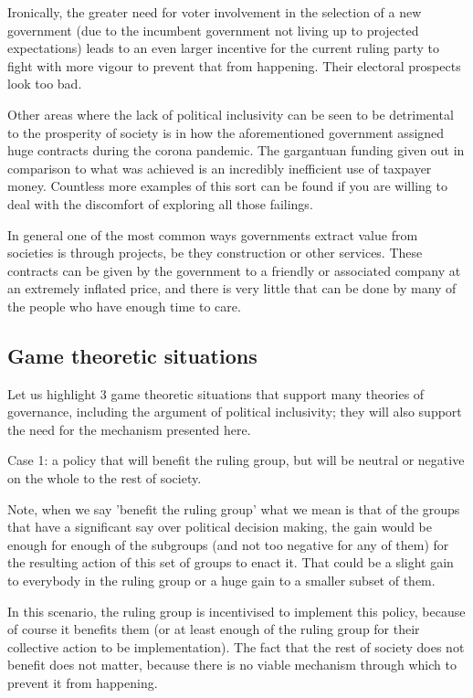 \documentclass[twoside]{article}
\begin{document}
Ironically, the greater need for voter involvement in the selection of a new government (due to the incumbent government not living up to projected expectations) leads to an even larger incentive for the current ruling party to fight with more vigour to prevent that from happening. Their electoral prospects look too bad.

Other areas where the lack of political inclusivity can be seen to be detrimental to the prosperity of society is in how the aforementioned government assigned huge contracts during the corona pandemic. The gargantuan funding given out in comparison to what was achieved is an incredibly inefficient use of taxpayer money. Countless more examples of this sort can be found if you are willing to deal with the discomfort of exploring all those failings.

In general one of the most common ways governments extract value from societies is through projects, be they construction or other services. These contracts can be given by the government to a friendly or associated company at an extremely inflated price, and there is very little that can be done by many of the people who have enough time to care.

\subsection{Game theoretic situations}

Let us highlight 3 game theoretic situations that support many theories of governance, including the argument of political inclusivity; they will also support the need for the mechanism presented here.

Case 1: a policy that will benefit the ruling group, but will be neutral or negative on the whole to the rest of society.

Note, when we say 'benefit the ruling group' what we mean is that of the groups that have a significant say over political decision making, the gain would be enough for enough of the subgroups (and not too negative for any of them) for the resulting action of this set of groups to enact it. That could be a slight gain to everybody in the ruling group or a huge gain to a smaller subset of them.

In this scenario, the ruling group is incentivised to implement this policy, because of course it benefits them (or at least enough of the ruling group for their collective action to be implementation). The fact that the rest of society does not benefit does not matter, because there is no viable mechanism through which to prevent it from happening.
\end{document}
